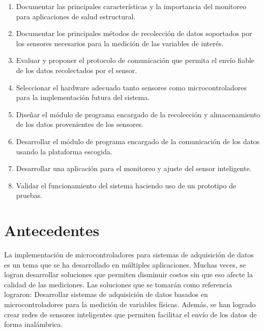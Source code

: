 \begin{enumerate}

	\item Documentar las principales características y la importancia del monitoreo para aplicaciones de salud estructural.

	\item Documentar los principales métodos de recolección de datos soportados por los sensores necesarios para la medición de las variables de interés.

	\item Evaluar y proponer el protocolo de comunicación que permita el envío fiable de los datos recolectados por el sensor.

	\item Seleccionar el hardware adecuado tanto sensores como microcontroladores para la implementación futura del sistema.

	\item Diseñar el módulo de programa encargado de la recolección y almacenamiento de los datos provenientes de los sensores.

	\item Desarrollar el módulo de programa encargado de la comunicación de los datos usando la plataforma escogida.
	
	\item Desarrollar una aplicación para el monitoreo y ajuste del sensor inteligente.

	\item Validar el funcionamiento del sistema haciendo uso de un prototipo de pruebas.

\end{enumerate}

\section{Antecedentes}

La implementación de microcontroladores para sistemas de adquisición de datos es un tema que se ha desarrollado en múltiples aplicaciones. Muchas veces, se logran desarrollar soluciones que permiten disminuir costos sin que eso afecte la calidad de las mediciones. Las soluciones que se tomarán como referencia lograron: Desarrollar sistemas de adquisición de datos basados en microcontroladores para la medición de variables físicas. Además, se han logrado crear redes de sensores inteligentes que permiten facilitar el envío de los datos de forma inalámbrica.


